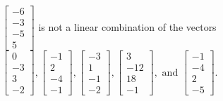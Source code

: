\begin{exercise}
\begin{exerciseStatement}
  \end{exerciseStatement}
  \begin{exerciseAnswer}
   \(\left[\begin{array}{c}
-6 \\
-3 \\
-5 \\
5
\end{array}\right]\) 
  	 is not  
	a linear combination of the vectors \(\left[\begin{array}{c}
0 \\
-3 \\
3 \\
-2
\end{array}\right] , \left[\begin{array}{c}
-1 \\
2 \\
-4 \\
-1
\end{array}\right] , \left[\begin{array}{c}
-3 \\
1 \\
-1 \\
-2
\end{array}\right] , \left[\begin{array}{c}
3 \\
-12 \\
18 \\
-1
\end{array}\right] , \text{ and } \left[\begin{array}{c}
-1 \\
-4 \\
2 \\
-5
\end{array}\right]\).

	
  


  \end{exerciseAnswer}
\end{exercise}
